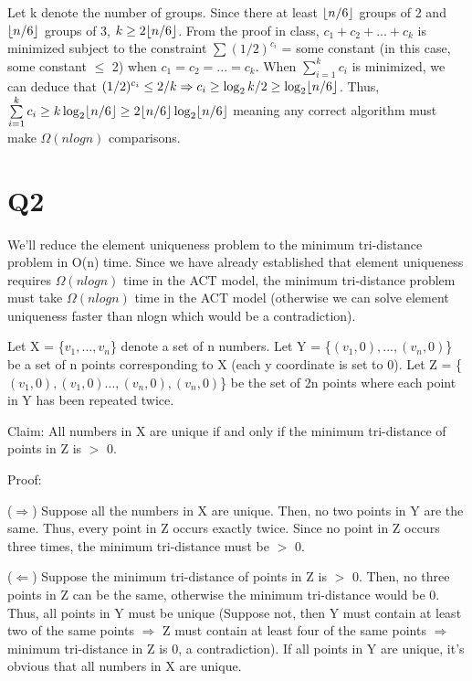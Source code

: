 \documentclass[11pt,a4paper]{article}
\DeclarePairedDelimiter\floor{\lfloor}{\rfloor}
\begin{document}
Let k denote the number of groups. Since there at least $\floor{n/6}$ groups of 2 and $\floor{n/6}$ groups of 3, $k \geq 2\floor{n/6}$. From the proof in class, $c_{1} + c_{2} + ... + c_{k}$ is minimized subject to the constraint $\sum (1/2)^{c_{i}}$ = some constant (in this case, some constant $\leq$ 2) when $c_{1} = c_{2} = ... = c_{k}$. When $\sum\limits_{i=1}^{k} c_{i}$ is minimized, we can deduce that $(1/2)^{c_{i}} \leq 2/k \Rightarrow c_{i} \geq \log_2 k/2 \geq \log_2 \floor{n/6}$. Thus, $\sum\limits_{i=1}^{k} c_{i} \geq k \log_2 \floor{n/6} \geq 2\floor{n/6}\log_2 \floor{n/6}$ meaning any correct algorithm must make $\Omega(nlogn)$ comparisons.


\section*{Q2}

We'll reduce the element uniqueness problem to the minimum tri-distance problem in O(n) time. Since we have already established that element uniqueness requires $\Omega(nlogn)$ time in the ACT model, the minimum tri-distance problem must take $\Omega(nlogn)$ time in the ACT model (otherwise we can solve element uniqueness faster than nlogn which would be a contradiction).

Let X = \{$v_{1},...,v_{n}$\} denote a set of n numbers. Let Y = \{$(v_{1}, 0),...,(v_{n}, 0)$\} be a set of n points corresponding to X (each y coordinate is set to 0). Let Z =  \{$(v_{1}, 0), (v_{1}, 0)...,(v_{n}, 0), (v_{n}, 0)$\} be the set of 2n points where each point in Y has been repeated twice.  \newline

Claim: All numbers in X are unique if and only if the minimum tri-distance of points in Z is $>$ 0. 

Proof: 

($\Rightarrow$) Suppose all the numbers in X are unique. Then, no two points in Y are the same. Thus, every point in Z occurs exactly twice. Since no point in Z occurs three times, the minimum tri-distance must be $>$ 0.

($\Leftarrow$) Suppose the minimum tri-distance of points in Z is $>$ 0. Then, no three points in Z can be the same, otherwise the minimum tri-distance would be 0. Thus, all points in Y must be unique (Suppose not, then Y must contain at least two of the same points $\Rightarrow$ Z must contain at least four of the same points $\Rightarrow$ minimum tri-distance in Z is 0, a contradiction). If all points in Y are unique, it's obvious that all numbers in X are unique. \newline
\end{document}
